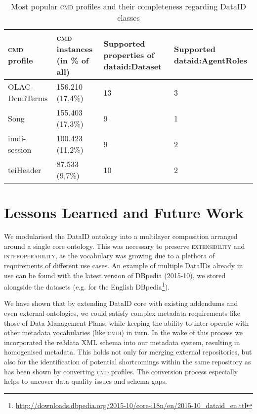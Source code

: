 \documentclass[runningheads,a4paper]{llncs}
\newcommand{\extensibility}{{\scshape extensibility}\xspace}
\newcommand{\interoperability}{{\scshape interoperability}\xspace}
\newcommand{\cmdi}{{\scshape cmdi}\xspace}
\newcommand{\cmd}{{\scshape cmd}\xspace}
\newcommand\footnoteurl[1]{\footnote{\scriptsize\url{#1}}}
\begin{document}
\begin{table}[t]
    \centering
    \begin{tabular}{l|p{3cm}|p{3cm}|p{3cm}}
        \hline
        \cmd profile & \cmd instances (in \% of all) & Supported properties of dataid:Dataset & Supported dataid:AgentRoles \\
        \hline
        OLAC-DcmiTerms & 156.210 (17,4\%) & 13 & 3 \\
        Song & 155.403 (17,3\%)& 9 & 1 \\
        imdi-session & 100.423 (11,2\%) & 9 & 2 \\
        teiHeader & 87.533 (9,7\%)& 10 & 2 \\
    \end{tabular}
    \caption{Most popular \cmd profiles and their completeness regarding DataID classes}
    \vspace{-2.5em}
    \label{tab:cmdi_profiles}
\end{table}


\section{Lessons Learned and Future Work}
\label{lessons}

We modularised the DataID ontology into a multilayer composition arranged around a single core ontology. This was necessary to preserve \extensibility and \interoperability, as the vocabulary was growing due to a plethora of requirements of different use cases. An example of multiple DataIDs already in use can be found with the latest version of DBpedia (2015-10), we stored alongside the datasets (e.g. for the English DBpedia\footnoteurl{http://downloads.dbpedia.org/2015-10/core-i18n/en/2015-10_dataid_en.ttl}).

We have shown that by extending DataID core with existing addendums and even external ontologies, we could satisfy complex metadata requirements like those of Data Management Plans, while keeping the ability to inter-operate with other metadata vocabularies (like \cmdi) in turn. In the wake of this process we incorporated the re3data XML schema into our metadata system, resulting in homogenised metadata. This holds not only for merging external repositories, but also for the identification of potential shortcomings within the same repository as has been shown by converting \cmd profiles. The conversion process especially helps to uncover data quality issues and schema gaps.
\end{document}

